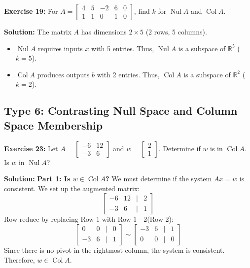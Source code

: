 \documentclass[11pt]{article}
\begin{document}
\vspace{0.5cm}

\textbf{Exercise 19:} For $A = \begin{bmatrix} 4 & 5 & -2 & 6 & 0 \\ 1 & 1 & 0 & 1 & 0 \end{bmatrix}$, find $k$ for $\operatorname{Nul} A$ and $\operatorname{Col} A$.

\textbf{Solution:}
The matrix $A$ has dimensions $2 \times 5$ (2 rows, 5 columns).
\begin{itemize}
    \item $\operatorname{Nul} A$ requires inputs $x$ with 5 entries. Thus, $\operatorname{Nul} A$ is a subspace of $\mathbb{R}^5$ ($k=5$).
    \item $\operatorname{Col} A$ produces outputs $b$ with 2 entries. Thus, $\operatorname{Col} A$ is a subspace of $\mathbb{R}^2$ ($k=2$).
\end{itemize}

\subsection{Type 6: Contrasting Null Space and Column Space Membership}

\textbf{Exercise 23:} Let $A = \begin{bmatrix} -6 & 12 \\ -3 & 6 \end{bmatrix}$ and $w = \begin{bmatrix} 2 \\ 1 \end{bmatrix}$. Determine if $w$ is in $\operatorname{Col} A$. Is $w$ in $\operatorname{Nul} A$?

\textbf{Solution:}
\textbf{Part 1: Is $w \in \operatorname{Col} A$?}
We must determine if the system $Ax = w$ is consistent. We set up the augmented matrix:
\[
\begin{bmatrix} -6 & 12 & \big| & 2 \\ -3 & 6 & \big| & 1 \end{bmatrix}
\]
Row reduce by replacing Row 1 with Row 1 - 2(Row 2):
\[
\begin{bmatrix} 0 & 0 & \big| & 0 \\ -3 & 6 & \big| & 1 \end{bmatrix} \sim \begin{bmatrix} -3 & 6 & \big| & 1 \\ 0 & 0 & \big| & 0 \end{bmatrix}
\]
Since there is no pivot in the rightmost column, the system is consistent. Therefore, $w \in \operatorname{Col} A$.
\end{document}

